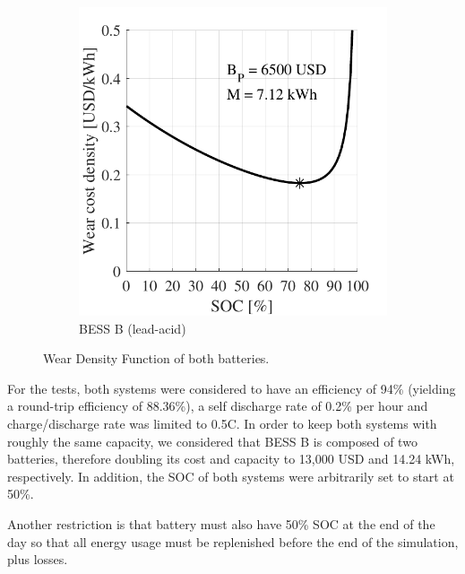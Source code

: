 \documentclass{ieeeaccess}
\begin{document}
\begin{figure}[!h]
\begin{subfigure}{.235\textwidth}
            \includegraphics[width=\linewidth]{figures/marginal_Rolls_8CH33P_lead-acid.pdf}
            \caption{\ac{BESS} B (lead-acid)}
            \label{fig:wn_curves1B}
        \end{subfigure}
        \caption{Wear Density Function of both batteries.}
        \label{fig:wn_curves1}
    \end{figure}

    For the tests, both systems were considered to have an efficiency of 94\% (yielding a round-trip efficiency of 88.36\%), a self discharge rate of 0.2\% per hour and charge/discharge rate was limited to 0.5C. In order to keep both systems with roughly the same capacity, we considered that \ac{BESS} B is composed of two batteries, therefore doubling its cost and capacity to 13,000 USD and 14.24 kWh, respectively. In addition, the \ac{SOC} of both systems were arbitrarily set to start at 50\%.
    
    Another restriction is that battery must also have 50\% \ac{SOC} at the end of the day so that all energy usage must be replenished before the end of the simulation, plus losses.
\end{document}
